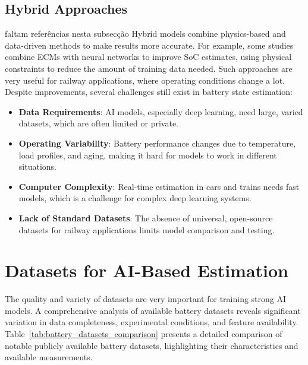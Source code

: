 \subsection{Hybrid Approaches}
\color{Red}faltam referências nesta subsecção\color{Black}
Hybrid models combine physics-based and data-driven methods to make results more accurate. For example, some studies combine ECMs with neural networks to improve SoC estimates, using physical constraints to reduce the amount of training data needed. Such approaches are very useful for railway applications, where operating conditions change a lot. Despite improvements, several challenges still exist in battery state estimation:
\begin{itemize}
    \item \textbf{Data Requirements}: AI models, especially deep learning, need large, varied datasets, which are often limited or private.
    \item \textbf{Operating Variability}: Battery performance changes due to temperature, load profiles, and aging, making it hard for models to work in different situations.
    \item \textbf{Computer Complexity}: Real-time estimation in cars and trains needs fast models, which is a challenge for complex deep learning systems.
    \item \textbf{Lack of Standard Datasets}: The absence of universal, open-source datasets for railway applications limits model comparison and testing.
\end{itemize}


\section{Datasets for AI-Based Estimation}
\label{subsec:datasets}
The quality and variety of datasets are very important for training strong AI models. A comprehensive analysis of available battery datasets reveals significant variation in data completeness, experimental conditions, and feature availability. Table~\ref{tab:battery_datasets_comparison} presents a detailed comparison of notable publicly available battery datasets, highlighting their characteristics and available measurements.

